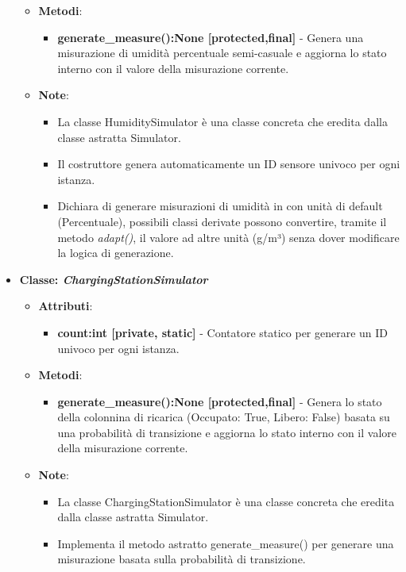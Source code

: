 \begin{itemize}
\begin{itemize}
\begin{itemize}
    \end{itemize}
    \item \textbf{Metodi}: 
    \begin{itemize}
        \item \textbf{generate\_measure():None [protected,final]} - Genera una misurazione di umidità percentuale semi-casuale e aggiorna lo stato interno con il valore della misurazione corrente.
    \end{itemize}
    \item \textbf{Note}:
    \begin{itemize}
        \item La classe HumiditySimulator è una classe concreta che eredita dalla classe astratta Simulator.
        \item Il costruttore genera automaticamente un ID sensore univoco per ogni istanza.
        \item Dichiara di generare misurazioni di umidità in con unità di default (Percentuale), possibili classi derivate possono convertire, tramite il metodo \textit{adapt()}, il valore ad altre unità (g/m³) senza dover modificare la logica di generazione.
    \end{itemize}
\end{itemize}
    \item{\textbf{Classe: \textit{ChargingStationSimulator}}}
    \begin{itemize}
        \item  \textbf{Attributi}: 
    \begin{itemize}
        \item \textbf{count:int [private, static]} - Contatore statico per generare un ID univoco per ogni istanza.
    \end{itemize}
    \item  \textbf{Metodi}:
    \begin{itemize}
        \item \textbf{generate\_measure():None [protected,final]} - Genera lo stato della colonnina di ricarica (Occupato: True, Libero: False) basata su una probabilità di transizione e aggiorna lo stato interno con il valore della misurazione corrente.
    \end{itemize}
    \item   \textbf{Note}:
    \begin{itemize}
        \item La classe ChargingStationSimulator è una classe concreta che eredita dalla classe astratta Simulator.
        \item Implementa il metodo astratto generate\_measure() per generare una misurazione basata sulla probabilità di transizione.

\end{itemize}
\end{itemize}
\end{itemize}
